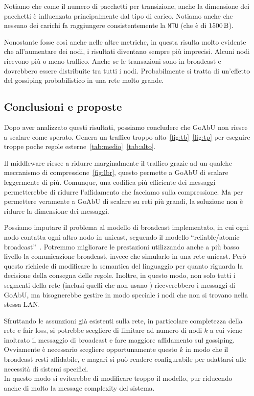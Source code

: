 \documentclass[12pt, a4paper]{article}
\begin{document}
Notiamo che come il numero di pacchetti per transizione, anche la dimensione dei pacchetti è influenzata principalmente dal tipo di carico.
Notiamo anche che nessuno dei carichi fa raggiungere consistentemente la \lstinline{MTU} (che è di $\qty{1500}{\byte}$).

Nonostante fosse così anche nelle altre metriche, in questa risulta molto evidente che all'aumentare dei nodi, i risultati diventano sempre più imprecisi.
Alcuni nodi ricevono più o meno traffico. Anche se le transazioni sono in broadcast e dovrebbero essere distribuite tra tutti i nodi.
Probabilmente si tratta di un'effetto del gossiping probabilistico in una rete molto grande.

\subsection{Conclusioni e proposte}

Dopo aver analizzato questi risultati, possiamo concludere che GoAbU non riesce a scalare come sperato. Genera un traffico troppo alto~\ref{fig:tb}~\ref{fig:tp} per eseguire troppe poche regole esterne~\ref{tab:medio}~\ref{tab:alto}.

Il middleware riesce a ridurre marginalmente il traffico grazie ad un qualche meccanismo di compressione~\ref{fig:lbr}, questo permette a GoAbU di scalare leggermente di più. Comunque, una codifica più efficiente dei messaggi permetterebbe di ridurre l'affidamento che facciamo sulla compressione. Ma per permettere veramente a GoAbU di scalare su reti più grandi, la soluzione non è ridurre la dimensione dei messaggi.

Possiamo imputare il problema al modello di broadcast implementato, in cui ogni nodo contatta ogni altro nodo in unicast, seguendo il modello ``reliable/atomic broadcast''~\cite{joseph1989reliable}.
Potremmo migliorare le prestazioni utilizzando anche a più basso livello la comunicazione broadcast, invece che simularlo in una rete unicast. Però questo richiede di modificare la semantica del linguaggio per quanto riguarda la decisione della consegna delle regole.
Inoltre, in questo modo, non solo tutti i segmenti della rete (inclusi quelli che non usano ) riceverebbero i messaggi di GoAbU, ma bisognerebbe gestire in modo speciale i nodi che non si trovano nella stessa LAN.

Sfruttando le assunzioni già esistenti sulla rete, in particolare completezza della rete e fair loss, si potrebbe scegliere di limitare ad numero di nodi $k$ a cui viene inoltrato il messaggio di broadcast e fare maggiore affidamento sul gossiping.
Ovviamente è necessario scegliere opportunamente questo $k$ in modo che il broadcast resti affidabile, e magari si può rendere configurabile per adattarsi alle necessità di sistemi specifici.\\
In questo modo si eviterebbe di modificare troppo il modello, pur riducendo anche di molto la message complexity del sistema.
\end{document}
